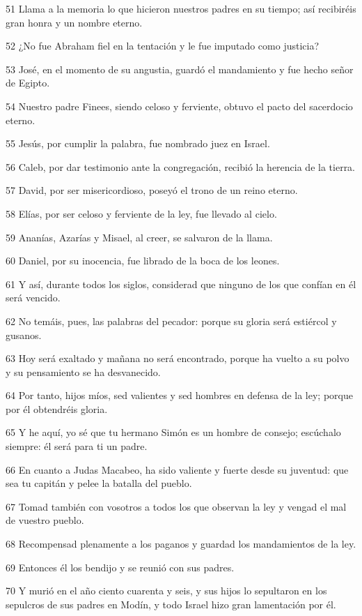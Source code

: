 \par 51 Llama a la memoria lo que hicieron nuestros padres en su tiempo; así recibiréis gran honra y un nombre eterno.
\par 52 ¿No fue Abraham fiel en la tentación y le fue imputado como justicia?
\par 53 José, en el momento de su angustia, guardó el mandamiento y fue hecho señor de Egipto.
\par 54 Nuestro padre Finees, siendo celoso y ferviente, obtuvo el pacto del sacerdocio eterno.
\par 55 Jesús, por cumplir la palabra, fue nombrado juez en Israel.
\par 56 Caleb, por dar testimonio ante la congregación, recibió la herencia de la tierra.
\par 57 David, por ser misericordioso, poseyó el trono de un reino eterno.
\par 58 Elías, por ser celoso y ferviente de la ley, fue llevado al cielo.
\par 59 Ananías, Azarías y Misael, al creer, se salvaron de la llama.
\par 60 Daniel, por su inocencia, fue librado de la boca de los leones.
\par 61 Y así, durante todos los siglos, considerad que ninguno de los que confían en él será vencido.
\par 62 No temáis, pues, las palabras del pecador: porque su gloria será estiércol y gusanos.
\par 63 Hoy será exaltado y mañana no será encontrado, porque ha vuelto a su polvo y su pensamiento se ha desvanecido.
\par 64 Por tanto, hijos míos, sed valientes y sed hombres en defensa de la ley; porque por él obtendréis gloria.
\par 65 Y he aquí, yo sé que tu hermano Simón es un hombre de consejo; escúchalo siempre: él será para ti un padre.
\par 66 En cuanto a Judas Macabeo, ha sido valiente y fuerte desde su juventud: que sea tu capitán y pelee la batalla del pueblo.
\par 67 Tomad también con vosotros a todos los que observan la ley y vengad el mal de vuestro pueblo.
\par 68 Recompensad plenamente a los paganos y guardad los mandamientos de la ley.
\par 69 Entonces él los bendijo y se reunió con sus padres.
\par 70 Y murió en el año ciento cuarenta y seis, y sus hijos lo sepultaron en los sepulcros de sus padres en Modín, y todo Israel hizo gran lamentación por él.

